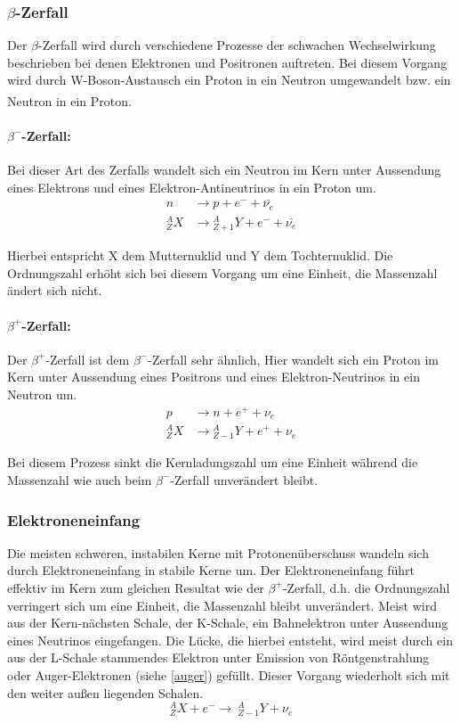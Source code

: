 \documentclass[12pt,listof=totoc]{scrartcl}
\begin{document}
\subsubsection{$\beta$-Zerfall \label{beta}}
Der $\beta$-Zerfall wird durch verschiedene Prozesse der schwachen Wechselwirkung beschrieben bei denen Elektronen  und Positronen auftreten. Bei diesem Vorgang wird durch W-Boson-Austausch ein Proton in ein Neutron umgewandelt bzw. ein Neutron in ein Proton.\textsuperscript{\cite{Demtröder}}

\paragraph*{$\beta^-$-Zerfall:} 
Bei dieser Art des Zerfalls wandelt sich ein Neutron im Kern unter Aussendung eines Elektrons und eines Elektron-Antineutrinos in ein Proton um. 
\begin{align*}
n &\rightarrow p + e^- + \bar{\nu_e}\\
{}_Z^A X &\rightarrow {}_{Z+1}^A Y + e^- + \bar{\nu_e}
\end{align*}

Hierbei entspricht X dem Mutternuklid und Y dem Tochternuklid. Die Ordnungszahl erhöht sich bei diesem Vorgang um eine Einheit, die Massenzahl ändert sich nicht.

\paragraph*{$\beta^+$-Zerfall:}
Der $\beta^+$-Zerfall ist dem $\beta^-$-Zerfall sehr ähnlich, Hier wandelt sich ein Proton im Kern unter Aussendung eines Positrons und eines Elektron-Neutrinos in ein Neutron um.
\begin{align*}
p &\rightarrow n + e^+ + \nu_e\\
{}_Z^A X &\rightarrow {}_{Z-1}^A Y + e^+ + \nu_e
\end{align*}

Bei diesem Prozess sinkt die Kernladungszahl um eine Einheit während die Massenzahl wie auch beim $\beta^-$-Zerfall unverändert bleibt.

\subsubsection{Elektroneneinfang}
Die meisten schweren, instabilen Kerne mit Protonenüberschuss wandeln sich durch Elektroneneinfang in stabile Kerne um.
Der Elektroneneinfang führt effektiv im Kern zum gleichen Resultat wie der $\beta^+$-Zerfall, d.h. die Ordnungszahl verringert sich um eine Einheit, die Massenzahl bleibt unverändert. Meist wird aus der Kern-nächsten Schale, der K-Schale, ein Bahnelektron unter Aussendung eines Neutrinos eingefangen. Die Lücke, die hierbei entsteht, wird meist durch ein aus der L-Schale stammendes Elektron unter Emission von Röntgenstrahlung oder Auger-Elektronen (siehe \ref{auger}) gefüllt. Dieser Vorgang wiederholt sich mit den weiter außen liegenden Schalen.
\[{}_Z^A X + e^- \rightarrow\ {}_{Z-1}^A Y + \nu_e\]
\end{document}
